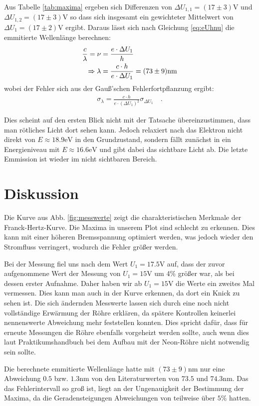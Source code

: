 \documentclass[12pt,a4paper,titlepage,headinclude,bibtotoc]{scrartcl}
\begin{document}
Aus Tabelle \ref{tab:maxima} ergeben sich Differenzen von $\Delta U_{1,1}=(17\pm 3)\si\volt$ und $\Delta U_{1,2}=(17 \pm 3)\si\volt$ so dass sich insgesamt ein gewichteter Mittelwert von $\Delta U_1=(17\pm 2)\si\volt$ ergibt.
Daraus lässt sich nach Gleichung \eqref{eq:eUhnu} die emmitierte Wellenlänge berechnen:
\begin{align}
\frac{c}{\lambda}=\nu &= \frac{e\cdot\Delta U_1}{h}\notag\\
\Rightarrow \lambda&=\frac{c\cdot h}{e\cdot\Delta U_1}=(73\pm 9)\si{\nano\metre}
\end{align}
wobei der Fehler sich aus der Gauß'schen Fehlerfortpflanzung ergibt:
\begin{align}
\sigma_\lambda=\frac{c\cdot h}{e\cdot(\Delta U_1)^2}\sigma_{\Delta U_1}\quad .
\end{align}

Dies scheint auf den ersten Blick nicht mit der Tatsache übereinzustimmen, dass man rötliches Licht dort sehen kann.
Jedoch relaxiert nach \cite[13.03.2015, 19 Uhr]{UniWuppertal} das Elektron nicht direkt von $E\approx 18.9\si\electronvolt$ in den Grundzustand, sondern fällt zunächst in ein Energieniveau mit $E\approx 16.6\si{\electronvolt}$ und gibt dabei das sichtbare Licht ab.
Die letzte Emmission ist wieder im nicht sichtbaren Bereich.

\section{Diskussion}
\label{sec:diskussion}
Die Kurve aus Abb. \ref{fig:messwerte} zeigt die charakteristischen Merkmale der Franck-Hertz-Kurve.
Die Maxima in unserem Plot sind schlecht zu erkennen.
Dies kann mit einer höheren Bremsspannung optimiert werden, was jedoch wieder den Stromfluss verringert, wodurch die Fehler größer werden.

Bei der Messung fiel uns nach dem Wert $U_1=17.5\si\volt$ auf, dass der zuvor aufgenommene Wert der Messung von $U_1=15\si\volt$ um 4\% größer war, als bei dessen erster Aufnahme.
Daher haben wir ab $U_1=15\si\volt$ die Werte ein zweites Mal vermessen.
Dies kann man auch in der Kurve erkennen, da dort ein Knick zu sehen ist.
Die sich ändernden Messwerte lassen sich durch eine noch nicht vollständige Erwärmung der Röhre erklären, da spätere Kontrollen keinerlei nennenswerte Abweichung mehr feststellen konnten.
Dies spricht dafür, dass für erneute Messungen die Röhre ebenfalls vorgeheizt werden sollte, auch wenn dies laut Praktikumshandbuch bei dem Aufbau mit der Neon-Röhre nicht notwendig sein sollte.

Die berechnete emmitierte Wellenlänge hatte mit $(73\pm9)\si{\nano\metre}$ nur eine Abweichung $0.5$ bzw. $1.3\si{\nano\metre}$ von den Literaturwerten von $73.5$ und $74.3\si{\nano\metre}$.
Das das Fehlerintervall so groß ist, liegt an der Ungenauigkeit der Bestimmung der Maxima, da die Geradensteigungen Abweichungen von teilweise über $5\%$ hatten.




\end{document}
